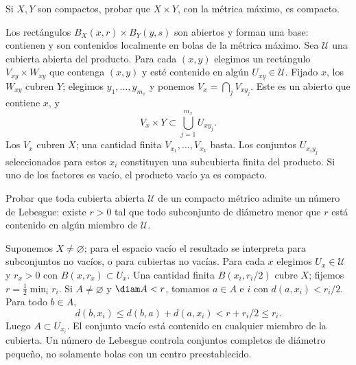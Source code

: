 \begin{ejercicio}\label{ej:lectura-13-7}
Si $X,Y$ son compactos, probar que $X\times Y$, con la métrica máximo, es compacto.
\end{ejercicio}
\begin{solucion}
Los rectángulos $B_X(x,r)\times B_Y(y,s)$ son abiertos y forman una base: contienen y son contenidos localmente en bolas de la métrica máximo. Sea $\mathcal U$ una cubierta abierta del producto. Para cada $(x,y)$ elegimos un rectángulo $V_{xy}\times W_{xy}$ que contenga $(x,y)$ y esté contenido en algún $U_{xy}\in\mathcal U$. Fijado $x$, los $W_{xy}$ cubren $Y$; elegimos $y_1,\ldots,y_{m_x}$ y ponemos $V_x=\bigcap_jV_{xy_j}$. Este es un abierto que contiene $x$, y
\[
V_x\times Y\subset\bigcup_{j=1}^{m_x}U_{xy_j}.
\]
Los $V_x$ cubren $X$; una cantidad finita $V_{x_1},\ldots,V_{x_k}$ basta. Los conjuntos $U_{x_i y_j}$ seleccionados para estos $x_i$ constituyen una subcubierta finita del producto. Si uno de los factores es vacío, el producto vacío ya es compacto.
\end{solucion}

\begin{ejercicio}\label{ej:lectura-13-8}
Probar que toda cubierta abierta $\mathcal U$ de un compacto métrico admite un número de Lebesgue: existe $r>0$ tal que todo subconjunto de diámetro menor que $r$ está contenido en algún miembro de $\mathcal U$.
\end{ejercicio}
\begin{solucion}
Suponemos $X\ne\varnothing$; para el espacio vacío el resultado se interpreta para subconjuntos no vacíos, o para cubiertas no vacías. Para cada $x$ elegimos $U_x\in\mathcal U$ y $r_x>0$ con $B(x,r_x)\subset U_x$. Una cantidad finita $B(x_i,r_i/2)$ cubre $X$; fijemos $r=\frac12\min_i r_i$. Si $A\ne\varnothing$ y $\diam A<r$, tomamos $a\in A$ e $i$ con $d(a,x_i)<r_i/2$. Para todo $b\in A$,
\[
d(b,x_i)\le d(b,a)+d(a,x_i)<r+r_i/2\le r_i.
\]
Luego $A\subset U_{x_i}$. El conjunto vacío está contenido en cualquier miembro de la cubierta. Un número de Lebesgue controla conjuntos completos de diámetro pequeño, no solamente bolas con un centro preestablecido.
\end{solucion}

